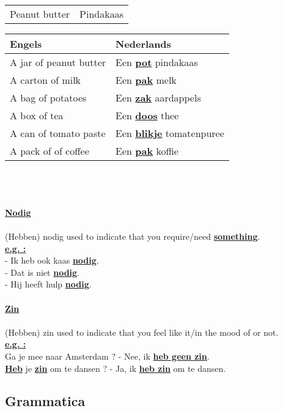 \documentclass[a4paper,14pt]{extarticle}
\newcommand{\emp}[1]{\underline{\textbf{#1}}}
\begin{document}
\begin{paracol}{2}
\begin{tabularx}{200pt}{ p{100pt} p{100pt} }
 Peanut butter & Pindakaas \\
\end{tabularx}
\switchcolumn
\begin{tabularx}{200pt}{ p{100pt} p{100pt} }
 \hline
 Engels & Nederlands\\
 \hline
 A jar of peanut butter & Een \emp{pot} pindakaas \\
 A carton of milk & Een \emp{pak} melk \\
 A bag of potatoes & Een \emp{zak} aardappels \\
 A box of tea & Een \emp{doos} thee \\
 A can of tomato paste & Een \emp{blikje} tomatenpuree \\
 A pack of of coffee & Een \emp{pak} koffie \\
\end{tabularx}
\hfill \\ \\ \\
\emp{Nodig} \\ \\
(Hebben) nodig used to indicate that you require/need \emp{something}. \\
\emp{e.g. : } \\
- Ik heb ook kaas \emp{nodig}. \\
- Dat is niet \emp{nodig}. \\
- Hij heeft hulp \emp{nodig}. \\ \\
\emp {Zin} \\ \\
(Hebben) zin used to indicate that you feel like it/in the mood of or not. \\
\emp{e.g. : } \\
Ga je mee naar Amsterdam ? - Nee, ik \emp{heb geen zin}. \\
\emp{Heb} je \emp{zin} om te dansen ? - Ja, ik \emp{heb zin} om te dansen. \\
\end{paracol}
\newpage
\subsection{Grammatica}
\end{document}
